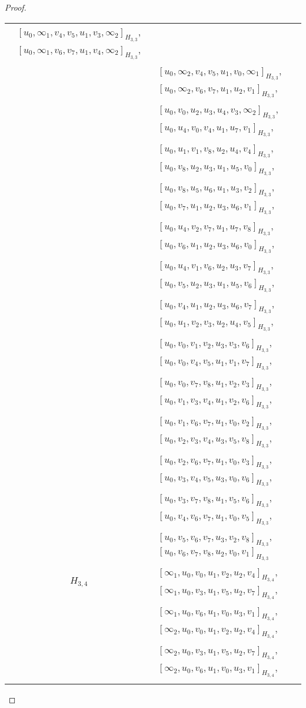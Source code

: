 \begin{subappendices}
\begin{proof}
{\begin{longtable}{|c|l|}
  $[u_0, \infty_1, v_4, v_5, u_1, v_3, \infty_2]_{H_{3,3}}$,
  $[u_0, \infty_1, v_6, v_7, u_1, v_4, \infty_2]_{H_{3,3}}$, \\* &
  $[u_0, \infty_2, v_4, v_5, u_1, v_0, \infty_1]_{H_{3,3}}$,
  $[u_0, \infty_2, v_6, v_7, u_1, u_2, v_1]_{H_{3,3}}$, \\* &
  $[u_0, v_0, u_2, u_3, u_4, v_3, \infty_2]_{H_{3,3}}$,
  $[u_0, u_4, v_0, v_4, u_1, u_7, v_1]_{H_{3,3}}$, \\* &
  $[u_0, u_1, v_1, v_8, u_2, u_4, v_4]_{H_{3,3}}$,
  $[u_0, v_8, u_2, u_3, u_1, u_5, v_0]_{H_{3,3}}$, \\* &
  $[u_0, v_8, u_5, u_6, u_1, u_3, v_2]_{H_{3,3}}$,
  $[u_0, v_7, u_1, u_2, u_3, u_6, v_1]_{H_{3,3}}$, \\* &
  $[u_0, u_4, v_2, v_7, u_1, u_7, v_8]_{H_{3,3}}$,
  $[u_0, v_6, u_1, u_2, u_3, u_6, v_0]_{H_{3,3}}$, \\* &
  $[u_0, u_4, v_1, v_6, u_2, u_3, v_7]_{H_{3,3}}$,
  $[u_0, v_5, u_2, u_3, u_1, u_5, v_6]_{H_{3,3}}$, \\* &
  $[u_0, v_4, u_1, u_2, u_3, u_6, v_7]_{H_{3,3}}$,
  $[u_0, u_1, v_2, v_3, u_2, u_4, v_5]_{H_{3,3}}$, \\* &
  $[u_0, v_0, v_1, v_2, u_3, v_3, v_6]_{H_{3,3}}$,
  $[u_0, v_0, v_4, v_5, u_1, v_1, v_7]_{H_{3,3}}$, \\* &
  $[u_0, v_0, v_7, v_8, u_1, v_2, v_3]_{H_{3,3}}$,
  $[u_0, v_1, v_3, v_4, u_1, v_2, v_6]_{H_{3,3}}$, \\* &
  $[u_0, v_1, v_6, v_7, u_1, v_0, v_2]_{H_{3,3}}$,
  $[u_0, v_2, v_3, v_4, u_3, v_5, v_8]_{H_{3,3}}$, \\* &
  $[u_0, v_2, v_6, v_7, u_1, v_0, v_3]_{H_{3,3}}$,
  $[u_0, v_3, v_4, v_5, u_3, v_0, v_6]_{H_{3,3}}$, \\* &
  $[u_0, v_3, v_7, v_8, u_1, v_5, v_6]_{H_{3,3}}$,
  $[u_0, v_4, v_6, v_7, u_1, v_0, v_5]_{H_{3,3}}$, \\* &
  $[u_0, v_5, v_6, v_7, u_3, v_2, v_8]_{H_{3,3}}$,
  $[u_0, v_6, v_7, v_8, u_2, v_0, v_1]_{H_{3,3}}$
\\ \hline
$H_{3,4}$ &
  $[\infty_1, u_0, v_0, u_1, v_2, u_2, v_4]_{H_{3,4}}$,
  $[\infty_1, u_0, v_3, u_1, v_5, u_2, v_7]_{H_{3,4}}$, \\* &
  $[\infty_1, u_0, v_6, u_1, v_0, u_3, v_1]_{H_{3,4}}$,
  $[\infty_2, u_0, v_0, u_1, v_2, u_2, v_4]_{H_{3,4}}$, \\* &
  $[\infty_2, u_0, v_3, u_1, v_5, u_2, v_7]_{H_{3,4}}$,
  $[\infty_2, u_0, v_6, u_1, v_0, u_3, v_1]_{H_{3,4}}$, \\* &

\end{longtable}}
\end{proof}
\end{subappendices}
